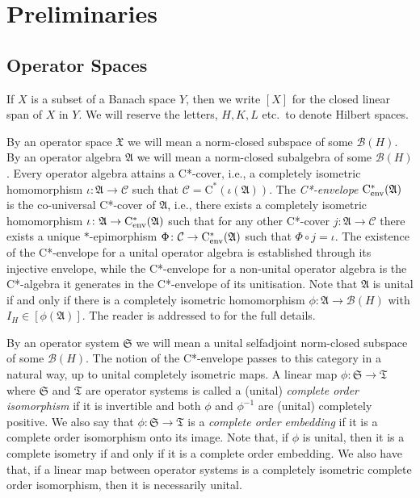 \documentclass[11pt, draft]{amsart}
\numberwithin{equation}{section}
\theoremstyle{plain}
\theoremstyle{definition}
\theoremstyle{remark}
\newcommand{\B}{{\mathcal{B}}}
\newcommand{\C}{{\mathcal{C}}}
\def\io{\iota}
\newcommand{\fA}{{\mathfrak{A}}}
\newcommand{\fS}{{\mathfrak{S}}}
\newcommand{\fT}{{\mathfrak{T}}}
\newcommand{\fX}{{\mathfrak{X}}}
\newcommand{\ca}{\mathrm{C}^*}
\newcommand{\cenv}{\mathrm{C}^*_{\textup{env}}}
\begin{document}
\section{Preliminaries} \label{S:pre}

\subsection{Operator Spaces}

If $X$ is a subset of a Banach space $Y$, then we write $[X]$ for the closed linear span of $X$ in $Y$.
We will reserve the letters, $H, K, L$ etc.\ to denote Hilbert spaces.

By an operator space $\fX$ we will mean a norm-closed subspace of some $\B(H)$.
By an operator algebra $\fA$ we will mean a norm-closed subalgebra of some $\B(H)$.
Every operator algebra attains a C*-cover, i.e., a completely isometric homomorphism $\io \colon \fA \to \C$ such that $\C = \ca(\io(\fA))$.
The \emph{C*-envelope} $\cenv(\fA)$ is the co-universal C*-cover of $\fA$, i.e., there exists a completely isometric homomorphism $\io \colon \fA \to \cenv(\fA)$ such that for any other C*-cover $j \colon \fA \to \C$ there exists a unique $*$-epimorphism $\Phi \colon \C \to \cenv(\fA)$ such that $\Phi \circ j = \io$.
The existence of the C*-envelope for a unital operator algebra is established through its injective envelope, while the C*-envelope for a non-unital operator algebra is the C*-algebra it generates in the C*-envelope of its unitisation.
Note that $\fA$ is unital if and only if there is a completely isometric homomorphism $\phi \colon \fA \to \B(H)$ with $I_H \in [\phi(\fA)]$.
The reader is addressed to \cite{BL04, Pau02} for the full details.

By an operator system $\fS$ we will mean a unital selfadjoint norm-closed subspace of some $\B(H)$.
The notion of the C*-envelope passes to this category in a natural way, up to unital completely isometric maps.
A linear map $\phi\colon \fS\to \fT$ where $\fS$ and $\fT$ are operator systems is called a (unital) \emph{complete order isomorphism} if it is invertible and both $\phi$ and $\phi^{-1}$ are (unital) completely positive. 
We also say that $\phi \colon \fS \to \fT$ is a \emph{complete order embedding} if it is a complete order isomorphism onto its image. 
Note that, if $\phi$ is unital, then it is a complete isometry if and only if it is a complete order embedding. 
We also have that, if a linear map between operator systems is a completely isometric complete order isomorphism, then it is necessarily unital.
\end{document}
